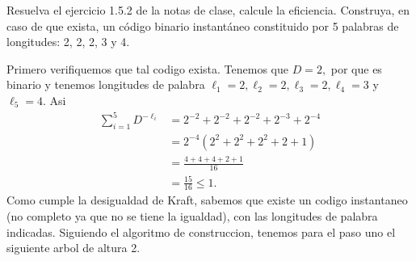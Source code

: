 
Resuelva el ejercicio 1.5.2 de la notas de clase, calcule la eficiencia.
Construya, en caso de que exista, un código binario instantáneo constituido por 5 palabras de longitudes: 2, 2, 2, 3 y 4.
\begin{sols}
    Primero verifiquemos que tal codigo exista. Tenemos que $D=2,$ por que es binario y tenemos longitudes de palabra $\ell_1=2,\ell_2=2, \ell_3=2, \ell_4=3$ y $\ell_5=4.$ Asi
    \begin{align*}
        \sum_{i=1}^5 D^{-\ell_i}&=2^{-2}+2^{-2}+2^{-2}+2^{-3}+2^{-4}\\
        &=2^{-4}(2^2+2^2+2^2+2+1)\\
        &=\frac{4+4+4+2+1}{16}\\
        &=\frac{15}{16}\leq 1.
    \end{align*}
    Como cumple la desigualdad de Kraft, sabemos que existe un codigo instantaneo (no completo ya que no se tiene la igualdad), con las longitudes de palabra indicadas. Siguiendo el algoritmo de construccion, tenemos para el paso uno el siguiente arbol de altura 2.
    \begin{center}
    \end{center}

\end{sols}